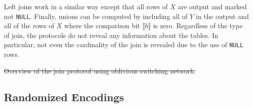 \documentclass[11pt,letterpaper]{article}
\newcommand{\ytable}{\ensuremath{T}\xspace}
\newcommand{\share}[1]{\ensuremath{\llbracket #1\rrbracket}\xspace}
\providecommand{\DIFdeltex}[1]{{\protect\color{red}\sout{#1}}}                      %
\providecommand{\DIFaddbegin}{} %
\providecommand{\DIFaddend}{} %
\providecommand{\DIFdelbegin}{} %
\providecommand{\DIFdelend}{} %
\providecommand{\DIFdelFL}[1]{\DIFdel{#1}} %
\providecommand{\DIFdel}[1]{\texorpdfstring{\DIFdeltex{#1}}{}} %
\begin{document}
Left joins work in a similar way except that all rows of $X$ are output and marked not \texttt{NULL}. Finally, unions can be computed by including all of $Y$ in the output and all of the rows of $X$ where the comparison bit $\share{b}$ is zero. Regardless of the type of join, the protocols do not reveal any information about the tables. In particular, not even the cardinality of the join is revealed due to the use of \texttt{NULL} rows.

\DIFdelbegin %



{%
\DIFdelFL{Overview of the join protocol using oblivious switching network.}%
}

\DIFdelend \subsection{Randomized Encodings}\DIFaddbegin \label{sec:encode}
\DIFaddend 
\end{document}
